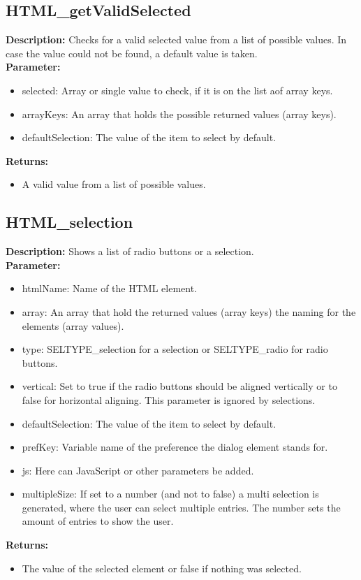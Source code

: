 \subsection{HTML\_getValidSelected}
\textbf{Description:} Checks for a valid selected value from a list of possible values. In case the value could not be found, a default value is taken.\\
\textbf{Parameter:}
\begin{itemize}
\item selected: Array or single value to check, if it is on the list aof array keys.
\item arrayKeys: An array that holds the possible returned values (array keys).
\item defaultSelection: The value of the item to select by default.
\end{itemize}
\textbf{Returns:}
\begin{itemize}
\item A valid value from a list of possible values.
\end{itemize}

\subsection{HTML\_selection}
\textbf{Description:} Shows a list of radio buttons or a selection.\\
\textbf{Parameter:}
\begin{itemize}
\item htmlName: Name of the HTML element.
\item array: An array that hold the returned values (array keys) the naming for the elements (array values).
\item type: SELTYPE\_selection for a selection or SELTYPE\_radio for radio buttons.
\item vertical: Set to true if the radio buttons should be aligned vertically or to false for horizontal aligning. This parameter is ignored by selections.
\item defaultSelection: The value of the item to select by default.
\item prefKey: Variable name of the preference the dialog element stands for.
\item js: Here can JavaScript or other parameters be added.
\item multipleSize: If set to a number (and not to false) a multi selection is generated, where the user can select multiple entries. The number sets the amount of entries to show the user.
\end{itemize}
\textbf{Returns:}
\begin{itemize}
\item The value of the selected element or false if nothing was selected.
\end{itemize}

